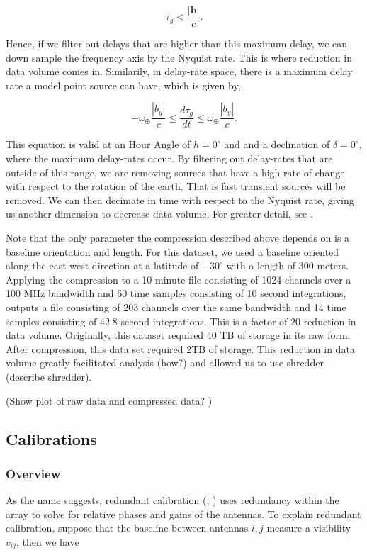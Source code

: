 \documentclass[twocolumn,numberedappendix]{emulateapj}
\begin{document}
\begin{equation}
    \tau_{g} < \frac{|\mathbf{b}|}{c}.
\end{equation}

Hence, if we filter out delays that are higher than this maximum delay, we can
down sample the frequency axis by the Nyquist rate. This is where reduction in
data volume comes in.  Similarily, in delay-rate space, there is a maximum
delay rate a model point source can have, which is given by, 

\begin{equation}
    -\omega_{\oplus}\frac{|b_{y}|}{c} \leq \frac{d\tau_{g}}{dt} 
                                     \leq \omega_{\oplus}\frac{|b_{y}|}{c}.
\end{equation}

This equation is valid at an Hour Angle of $h = 0^{\circ}$ and and a declination
of $\delta = 0^{\circ}$, where the maximum delay-rates occur. 
By filtering out delay-rates that are outside of this range, we are removing
sources that have a high rate of change with respect to the rotation of the
earth. That is fast transient sources will be removed. We can then decimate in
time with respect to the Nyquist rate, giving us another dimension to decrease
data volume. For greater detail, see \cite{parsons_et_al2014a}.

Note that the only parameter the compression described above depends on is a baseline
orientation and length. For this dataset, we used a baseline oriented along the
east-west direction at a latitude of $-30^{\circ}$ with a length of
300 meters.
Applying the compression to a 10 minute file consisting of 1024 channels over a
100 MHz bandwidth and 60 time samples consisting of 
10 second integrations, outputs a file consisting of 203 channels over the same
bandwidth and 14 time samples consisting of 42.8 second integrations. This is a
factor of 20 reduction in data volume. Originally, this dataset required 40 TB
of storage in its raw form. After compression, this data set required 2TB of
storage. This reduction in data volume greatly facilitated analysis (how?) and
allowed us to use shredder (describe shredder).

(Show plot of raw data and compressed data? )


\subsection{Calibrations}
\subsubsection{Overview}
As the name suggests, redundant calibration (\cite{liu_et_al2010},
\cite{zheng_et_al2014}) uses redundancy within the array to solve for relative
phases and gains of the antennas. To explain redundant calibration, suppose that
the baseline between antennas $i,j$ measure a visibility $v_{ij}$, then we have 
\end{document}
